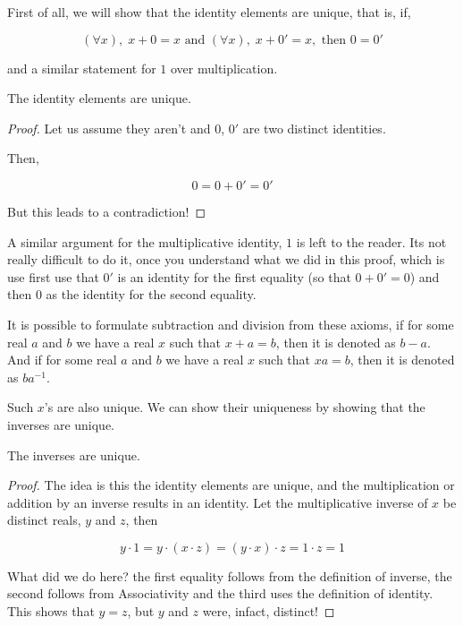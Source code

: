 First of all, we will show that the identity elements are unique, that is, if,

\begin{equation*}
    (\forall x),\; x + 0 = x \text{ and } (\forall x),\; x + 0' = x, \text{ then } 0 = 0'
\end{equation*}

and a similar statement for \(1\) over multiplication.

\begin{proposition}
    The identity elements are unique.
\end{proposition}

\begin{proof}
    Let us assume they aren't and \(0\), \(0'\) are two distinct identities.

    Then, 

    \begin{equation*}
        0 = 0 + 0' = 0'
    \end{equation*}

    But this leads to a contradiction! \lightning
\end{proof}


A similar argument for the multiplicative identity, \(1\) is left to the reader. Its 
not really difficult to do it, once you understand what we did in this proof, which is 
use first use that \(0'\) is an identity for the first equality (so that \(0 + 0' = 0\)) 
and then \(0\) as the identity for the second equality. 

It is possible to formulate subtraction and division from these axioms, if for some real \(a\) and \(b\) we have a real
\(x\) such that \(x + a = b\), then it is denoted as \(b - a\). 
And if for some real \(a\) and \(b\) we have a real \(x\) such that \(xa = b\), then it is denoted as \(ba^{-1}\). 

Such \(x\)'s are also unique. We can show their uniqueness by showing that the inverses are unique.

\begin{proposition}
    The inverses are unique.
\end{proposition}

\begin{proof}
    The idea is this the identity elements are unique, and the multiplication or addition
    by an inverse results in an identity. Let the multiplicative inverse of \(x\) be 
    distinct reals, \(y\) and \(z\), then  

    \begin{equation*}
        y \cdot 1 = y \cdot (x \cdot z) = (y \cdot x) \cdot z = 1 \cdot z = 1
    \end{equation*}

    What did we do here? the first equality follows from the definition 
    of inverse, the second follows from Associativity and the third uses the 
    definition of identity. This shows that \(y = z\), but \(y\) and \(z\) 
    were, infact, distinct! \lightning

\end{proof}

